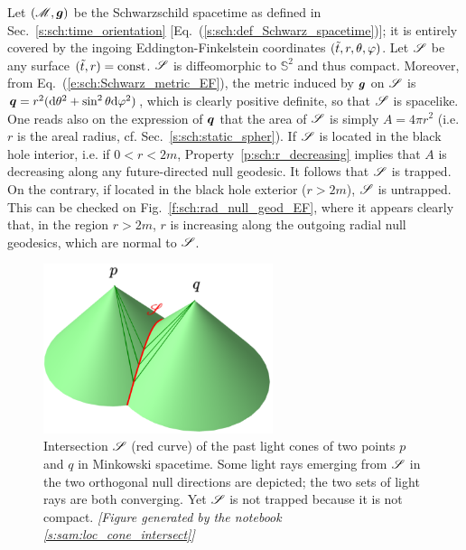 \begin{example}
Let $(\mathscr{M},\bm{g})$ be the Schwarzschild spacetime as defined in Sec.~\ref{s:sch:time_orientation} [Eq.~(\ref{s:sch:def_Schwarz_spacetime})]; it is entirely covered by the ingoing Eddington-Finkelstein coordinates
$({\tilde t},r,\theta,\varphi)$. Let $\mathscr{S}$ be any surface $({\tilde t},r) = \mathrm{const}$.
$\mathscr{S}$ is diffeomorphic to $\mathbb{S}^2$ and thus compact.
Moreover, from Eq.~(\ref{e:sch:Schwarz_metric_EF}), the metric induced by $\bm{g}$
on $\mathscr{S}$ is $\bm{q} = r^2 (\mathrm{d}\theta^2 + \sin^2\theta\mathrm{d}\varphi^2)$, which is clearly positive definite, so
that $\mathscr{S}$ is spacelike. One reads also on the expression of $\bm{q}$
that the area of  $\mathscr{S}$ is simply $A = 4\pi r^2$ (i.e. $r$ is the areal radius, cf. Sec.~\ref{s:sch:static_spher}).
If $\mathscr{S}$ is located in the black hole interior, i.e. if $0<r < 2m$,
Property~\ref{p:sch:r_decreasing} implies that $A$ is decreasing along any future-directed null
geodesic. It follows that $\mathscr{S}$ is trapped. On the contrary, if located in the black hole exterior
($r> 2m$), $\mathscr{S}$ is untrapped. This can be checked on Fig.~\ref{f:sch:rad_null_geod_EF},
where it appears clearly that, in the region $r>2m$, $r$ is increasing along the outgoing radial null geodesics, which are normal to $\mathscr{S}$.
\end{example}

\begin{figure}
\centerline{\includegraphics[width=0.6\textwidth]{loc_cone_intersect.png}}
\caption[]{\label{f:loc:cone_intersect} \footnotesize
Intersection $\mathscr{S}$ (red curve) of the past light cones of two points $p$ and $q$ in Minkowski spacetime.
Some light rays emerging from $\mathscr{S}$ in the two orthogonal null directions are depicted; the two sets
of light rays are both converging. Yet $\mathscr{S}$ is not trapped because it is not compact.
\textsl{[Figure generated by the notebook \ref{s:sam:loc_cone_intersect}]}
}
\end{figure}

